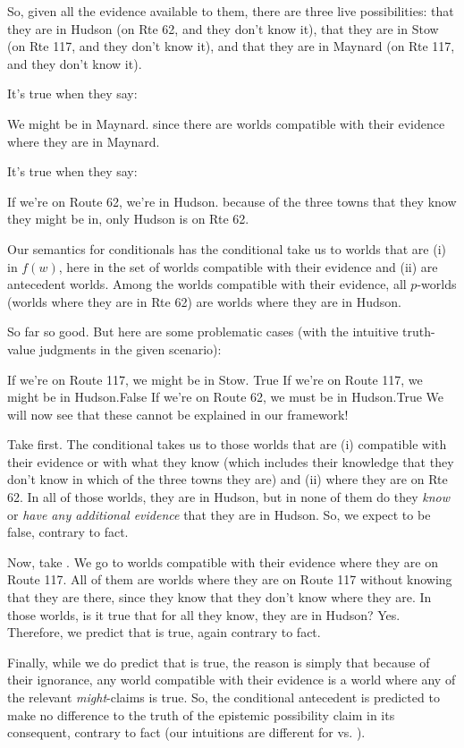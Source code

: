 So, given all the evidence available to them, there are three live
possibilities: that they are in Hudson (on Rte 62, and they don't know it), that
they are in Stow (on Rte 117, and they don't know it), and that they are in
Maynard (on Rte 117, and they don't know it).

It's true when they say:

\ex We might be in Maynard.\xe
%
since there are worlds compatible with their evidence where they are in
Maynard.

\kwn It's true when they say:

\ex If we're on Route 62, we're in Hudson.\label{ex:bare-hudson}\xe
%
because of the three towns that they know they might be in, only Hudson
is on Rte 62.

Our semantics for conditionals has the conditional take us to worlds that are
(i) in $f(w)$, here in the set of worlds compatible with their evidence and (ii)
are antecedent worlds. Among the worlds compatible with their evidence, all
$p$-worlds (worlds where they are in Rte 62) are worlds where they are in
Hudson.

So far so good. But here are some problematic cases (with the intuitive
truth-value judgments in the given scenario):

\pex\label{ex:trouble}%
\a If we're on Route 117, we might be in Stow. \hfill True
\a If we're on Route 117, we might be in Hudson.\hfill False
\a If we're on Route 62, we must be in Hudson.\hfill True
\xe
%
We will now see that these cannot be explained in our framework!

Take \Last[c] first. The conditional takes us to those worlds that are (i)
compatible with their evidence or with what they know (which includes their
knowledge that they don't know in which of the three towns they are) and (ii)
where they are on Rte 62. In all of those worlds, they are in Hudson, but in
none of them do they \emph{know} or \emph{have any additional evidence} that
they are in Hudson. So, we expect \Last[c] to be false, contrary to fact.

Now, take \Last[b]. We go to worlds compatible with their evidence where they
are on Route 117. All of them are worlds where they are on Route 117 without
knowing that they are there, since they know that they don't know where they
are. In those worlds, is it true that for all they know, they are in Hudson?
Yes. Therefore, we predict that \Last[b] is true, again contrary to fact.

Finally, while we do predict that \Last[a] is true, the reason is simply that
because of their ignorance, any world compatible with their evidence is a world
where any of the relevant \emph{might}-claims is true. So, the conditional
antecedent is predicted to make no difference to the truth of the epistemic
possibility claim in its consequent, contrary to fact (our intuitions are
different for \Last[a] vs. \Last[b]).


